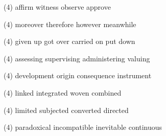 \begin{tasks}(4)
	\task affirm
	\task witness
	\task observe
	\task approve
\end{tasks}
\item
\begin{tasks}(4)
	\task moreover
	\task therefore
	\task however
	\task meanwhile
\end{tasks}
\item
\begin{tasks}(4)
	\task given up
	\task got over
	\task carried on
	\task put down
\end{tasks}
\item
\begin{tasks}(4)
	\task assessing
	\task supervising
	\task administering
	\task valuing
\end{tasks}
\item
\begin{tasks}(4)
	\task development
	\task origin
	\task consequence
	\task instrument
\end{tasks}
\item
\begin{tasks}(4)
	\task linked
	\task integrated
	\task woven
	\task combined
\end{tasks}
\item
\begin{tasks}(4)
	\task limited
	\task subjected
	\task converted
	\task directed
\end{tasks}
\item
\begin{tasks}(4)
	\task paradoxical
	\task incompatible
	\task inevitable
	\task continuous
\end{tasks}
